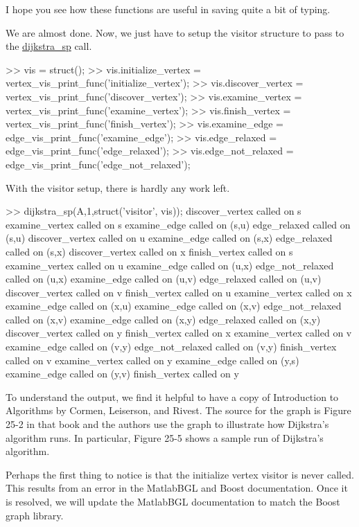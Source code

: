 \documentclass[12pt]{article}
\newcommand{\mycmd}[1]{\url{#1}}
\begin{document}
 I hope you see how these functions are useful in saving quite a bit of
 typing.

 We are almost done.  Now, we just have to setup the visitor structure to
 pass to the \mycmd{dijkstra_sp} call.

\begin{mcode}
>> vis = struct();
>> vis.initialize_vertex = vertex_vis_print_func('initialize_vertex');
>> vis.discover_vertex = vertex_vis_print_func('discover_vertex');
>> vis.examine_vertex = vertex_vis_print_func('examine_vertex');
>> vis.finish_vertex = vertex_vis_print_func('finish_vertex');
>> vis.examine_edge = edge_vis_print_func('examine_edge');
>> vis.edge_relaxed = edge_vis_print_func('edge_relaxed');
>> vis.edge_not_relaxed = edge_vis_print_func('edge_not_relaxed');
\end{mcode}

 With the visitor setup, there is hardly any work left.  

\begin{mcode}
>> dijkstra_sp(A,1,struct('visitor', vis));
discover_vertex called on s
examine_vertex called on s
examine_edge called on (s,u)
edge_relaxed called on (s,u)
discover_vertex called on u
examine_edge called on (s,x)
edge_relaxed called on (s,x)
discover_vertex called on x
finish_vertex called on s
examine_vertex called on u
examine_edge called on (u,x)
edge_not_relaxed called on (u,x)
examine_edge called on (u,v)
edge_relaxed called on (u,v)
discover_vertex called on v
finish_vertex called on u
examine_vertex called on x
examine_edge called on (x,u)
examine_edge called on (x,v)
edge_not_relaxed called on (x,v)
examine_edge called on (x,y)
edge_relaxed called on (x,y)
discover_vertex called on y
finish_vertex called on x
examine_vertex called on v
examine_edge called on (v,y)
edge_not_relaxed called on (v,y)
finish_vertex called on v
examine_vertex called on y
examine_edge called on (y,s)
examine_edge called on (y,v)
finish_vertex called on y
\end{mcode}

 To understand the output, we find it helpful to have a copy of
 Introduction to Algorithms by Cormen, Leiserson, and Rivest.  The source
 for the graph is Figure 25-2 in that book and the authors use the graph
 to illustrate how Dijkstra's algorithm runs.  In particular, Figure 25-5
 shows a sample run of Dijkstra's algorithm.

 Perhaps the first thing to notice is that the initialize vertex visitor
 is never called.  This results from an error in the MatlabBGL and Boost
 documentation.  Once it is resolved, we will update the MatlabBGL
 documentation to match the Boost graph library.
\end{document}
